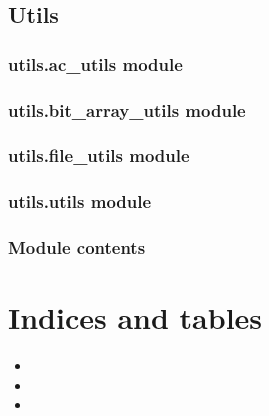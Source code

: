 \documentclass[letterpaper,10pt,english]{sphinxmanual}
\begin{document}
\section{Utils}
\label{\detokenize{utils:utils}}\label{\detokenize{utils::doc}}

\subsection{utils.ac\_utils module}
\label{\detokenize{utils:utils-ac-utils-module}}

\subsection{utils.bit\_array\_utils module}
\label{\detokenize{utils:utils-bit-array-utils-module}}

\subsection{utils.file\_utils module}
\label{\detokenize{utils:utils-file-utils-module}}

\subsection{utils.utils module}
\label{\detokenize{utils:utils-utils-module}}

\subsection{Module contents}
\label{\detokenize{utils:module-contents}}

\chapter{Indices and tables}
\label{\detokenize{index:indices-and-tables}}\begin{itemize}
\item {} 
\sphinxAtStartPar
{}

\item {} 
\sphinxAtStartPar
{}

\item {} 
\sphinxAtStartPar
{}

\end{itemize}



\renewcommand{\indexname}{Index}
\printindex
\end{document}
